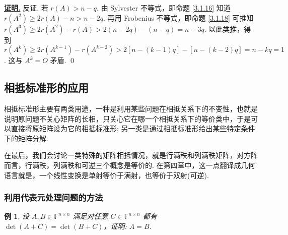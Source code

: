 \documentclass[10pt,openany]{article}
\theoremstyle{thmstyle} %
\theoremstyle{defstyle} %
\theoremstyle{prostyle} %
\theoremstyle{exastyle}
\newtheorem{example}[theorem]{例}
\theoremstyle{remstyle}
\renewenvironment{proof}[1][证明]{\par\underline{\textbf{#1.}} \;\fangsong}{\qed\par}
\newcommand{\F}{\mathbb{F}}
\newcommand{\n}{^{n \times n}}
\begin{document}
\begin{proof}
	反证. 若 \( r(A)>n-q \). 由 Sylvester 不等式，即命题 \ref{3.1.16} 知道 \( r(A^2) \geq 2r(A)-n > n-2q \). 再用 Frobenius 不等式，即命题 \ref{3.1.18} 可推知 \( r(A^3) \geq 2r(A^2)-r(A) > 2(n-2q)-(n-q)=n-3q \). 以此类推，得到 \( r(A^k) \geq 2r(A^{k-1})-r(A^{k-2})> 2[n-(k-1)q]-[n-(k-2)q]=n-kq=1 \). 这与 \( A^k=O \) 矛盾. 
\end{proof}


\subsection{相抵标准形的应用}

相抵标准形主要有两类用途，一种是利用某些问题在相抵关系下的不变性，也就是说明原问题不关心矩阵的长相，只关心它在哪一个相抵关系下的等价类中，于是可以直接将原矩阵设为它的相抵标准形; 另一类是通过相抵标准形给出某些特定条件下的矩阵分解. 

在最后，我们会讨论一类特殊的矩阵相抵情况，就是行满秩和列满秩矩阵，对方阵而言，行满秩，列满秩和可逆三个概念是等价的. 在第四章中，这一点翻译成几何语言就是，一个线性变换是单射等价于满射，也等价于双射(可逆).

\subsubsection{利用代表元处理问题的方法}

\begin{example}
	设 \( A,B \in \F\n \) 满足对任意 \( C \in \F\n \) 都有 \( \det(A+C)=\det(B+C) \)，证明: \( A=B \).
\end{example}
\end{document}
